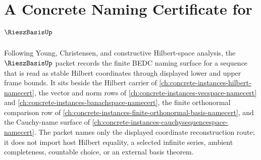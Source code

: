 \chapter{A Concrete Naming Certificate for $\RieszBasisUp$}
\label{ch:concrete-instances-riesz-basis-namecert}

Following Young, Christensen, and constructive Hilbert-space analysis, the $\RieszBasisUp$ packet records the finite BEDC naming surface for a sequence that is read as stable Hilbert coordinates through displayed lower and upper frame bounds. It sits beside the Hilbert carrier of \autoref{ch:concrete-instances-hilbert-namecert}, the vector and norm rows of \autoref{ch:concrete-instances-vecspace-namecert} and \autoref{ch:concrete-instances-banachspace-namecert}, the finite orthonormal comparison row of \autoref{ch:concrete-instances-finite-orthonormal-basis-namecert}, and the Cauchy-name surface of \autoref{ch:concrete-instances-cauchysequencespace-namecert}. The packet names only the displayed coordinate reconstruction route; it does not import host Hilbert equality, a selected infinite series, ambient completeness, countable choice, or an external basis theorem.

